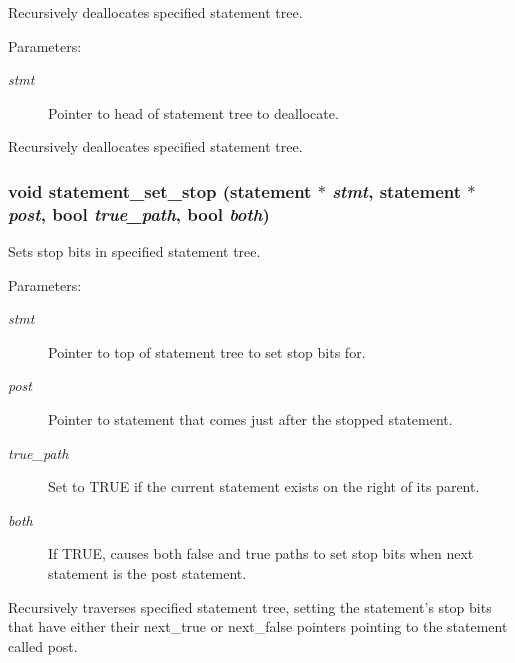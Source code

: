 Recursively deallocates specified statement tree. 

\begin{Desc}
\item[Parameters:]
\begin{description}
\item[{\em stmt}]Pointer to head of statement tree to deallocate.\end{description}
\end{Desc}
Recursively deallocates specified statement tree. 
\subsubsection{\setlength{\rightskip}{0pt plus 5cm}void statement\_\-set\_\-stop ({\bf statement} $\ast$ {\em stmt}, {\bf statement} $\ast$ {\em post}, {\bf bool} {\em true\_\-path}, {\bf bool} {\em both})}\label{statement_8h_a4}


Sets stop bits in specified statement tree. 

\begin{Desc}
\item[Parameters:]
\begin{description}
\item[{\em stmt}]Pointer to top of statement tree to set stop bits for. \item[{\em post}]Pointer to statement that comes just after the stopped statement. \item[{\em true\_\-path}]Set to TRUE if the current statement exists on the right of its parent. \item[{\em both}]If TRUE, causes both false and true paths to set stop bits when next statement is the post statement.\end{description}
\end{Desc}
Recursively traverses specified statement tree, setting the statement's stop bits that have either their next\_\-true or next\_\-false pointers pointing to the statement called post. 